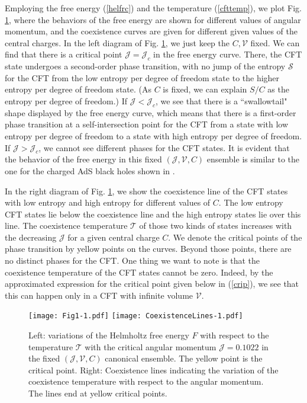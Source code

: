 \documentclass[a4paper,11pt]{article}
\newcommand{\eq}[1]{(\ref{#1})}
\newcommand{\fig}[1]{Fig. \ref{#1}}
\def\T{\mathcal{T}} \def\O{\mathcal{O}} \def\S{\mathcal{S}}\def\J{\mathcal{J}}\def\V{\mathcal{V}}\def\Q{\mathcal{Q}}\def\F{\mathcal{F}}
\begin{document}
Employing the free energy \eq{helfrc} and the temperature \eq{cfttemp}, we plot \fig{fig1}, where the behaviors of the free energy are shown for different values of angular momentum, and  the coexistence curves are given for different given values of the central charges. In the left diagram of \fig{fig1}, we just keep the $C, \V$ fixed. We can find that there is a critical point $\J=\J_c$ in the free energy curve. There, the CFT state undergoes a second-order phase transition, with no jump of the entropy $\S$ for the CFT from the low entropy per degree of freedom state to the higher entropy per degree of freedom state. (As $C$ is fixed, we can explain $S/C$ as the entropy per degree of freedom.) If $\J<\J_c$, we see that there is a ``swallowtail" shape displayed by the free energy curve, which means that there is a first-order phase transition at a self-intersection point for the CFT from a state with low entropy per degree of freedom to a state with high entropy per degree of freedom. If $\J>\J_c$, we cannot see different phases for the CFT states. It is evident that the behavior of the free energy in this fixed $(\J, \mathcal{V}, C)$ ensemble is similar to the one for the charged AdS black holes shown in \cite{Cong:2021fnf}.  

In the right diagram of \fig{fig1}, we show the coexistence line of the CFT states with low entropy  and high entropy for different values of $C$.  The low entropy CFT states lie below the coexistence line and the high entropy states lie over this line. The coexistence temperature $\T$ of those two kinds of states increases with the decreasing $\J$ for a given central charge $C$. We denote the critical points of the phase transition by yellow points on the curves. Beyond those points, there are no distinct phases for the CFT. One thing we want to note is that  the coexistence temperature of the CFT states cannot be zero. Indeed, by the approximated expression for the critical point given below in \eq{crip}, we see that this can happen only in a CFT with infinite volume $\V$. 







\begin{figure}[tbp!]
\begin{center}
\texttt{[image: Fig1-1.pdf]}
\texttt{[image: CoexistenceLines-1.pdf]}
\end{center}
\vspace{-5mm}
 \caption {Left: variations of the Helmholtz free energy $F$ with respect to the temperature $\T$ with the critical angular momentum $\J=0.1022$ in the fixed $(\J, \V, C)$ canonical ensemble. The yellow point is the critical point. Right: Coexistence lines indicating the variation of the coexistence temperature with respect to the angular momentum. The lines end at yellow critical points.}
 \label{fig1}
\end{figure}
\end{document}
